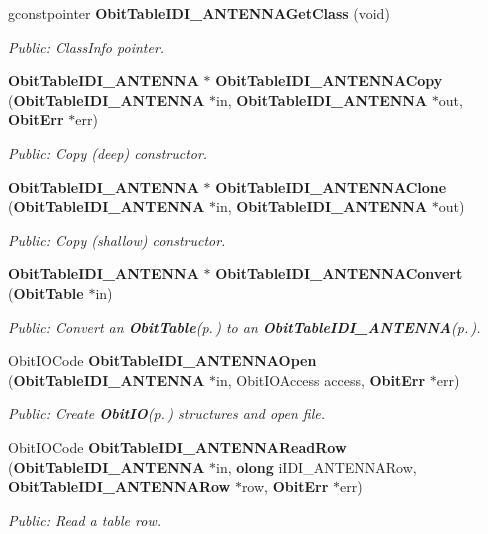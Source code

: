 \begin{CompactItemize}
gconstpointer {\bf Obit\-Table\-IDI\_\-ANTENNAGet\-Class} (void)
\begin{CompactList}\small\item\em Public: Class\-Info pointer. \item\end{CompactList}\item 
{\bf Obit\-Table\-IDI\_\-ANTENNA} $\ast$ {\bf Obit\-Table\-IDI\_\-ANTENNACopy} ({\bf Obit\-Table\-IDI\_\-ANTENNA} $\ast$in, {\bf Obit\-Table\-IDI\_\-ANTENNA} $\ast$out, {\bf Obit\-Err} $\ast$err)
\begin{CompactList}\small\item\em Public: Copy (deep) constructor. \item\end{CompactList}\item 
{\bf Obit\-Table\-IDI\_\-ANTENNA} $\ast$ {\bf Obit\-Table\-IDI\_\-ANTENNAClone} ({\bf Obit\-Table\-IDI\_\-ANTENNA} $\ast$in, {\bf Obit\-Table\-IDI\_\-ANTENNA} $\ast$out)
\begin{CompactList}\small\item\em Public: Copy (shallow) constructor. \item\end{CompactList}\item 
{\bf Obit\-Table\-IDI\_\-ANTENNA} $\ast$ {\bf Obit\-Table\-IDI\_\-ANTENNAConvert} ({\bf Obit\-Table} $\ast$in)
\begin{CompactList}\small\item\em Public: Convert an {\bf Obit\-Table}{\rm (p.\,\pageref{structObitTable})} to an {\bf Obit\-Table\-IDI\_\-ANTENNA}{\rm (p.\,\pageref{structObitTableIDI__ANTENNA})}. \item\end{CompactList}\item 
Obit\-IOCode {\bf Obit\-Table\-IDI\_\-ANTENNAOpen} ({\bf Obit\-Table\-IDI\_\-ANTENNA} $\ast$in, Obit\-IOAccess access, {\bf Obit\-Err} $\ast$err)
\begin{CompactList}\small\item\em Public: Create {\bf Obit\-IO}{\rm (p.\,\pageref{structObitIO})} structures and open file. \item\end{CompactList}\item 
Obit\-IOCode {\bf Obit\-Table\-IDI\_\-ANTENNARead\-Row} ({\bf Obit\-Table\-IDI\_\-ANTENNA} $\ast$in, {\bf olong} i\-IDI\_\-ANTENNARow, {\bf Obit\-Table\-IDI\_\-ANTENNARow} $\ast$row, {\bf Obit\-Err} $\ast$err)
\begin{CompactList}\small\item\em Public: Read a table row. \item\end{CompactList}\item 

\end{CompactItemize}
